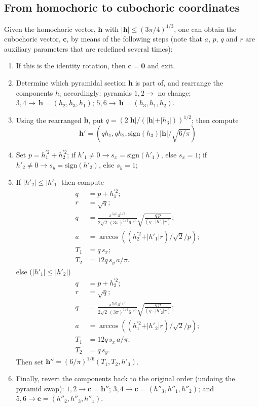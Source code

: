 \subsection{From homochoric to cubochoric coordinates}
Given the homochoric vector, $\mathbf{h}$ with $\vert\mathbf{h}\vert\le (3\pi/4)^{1/3}$, one can obtain the cubochoric vector, $\mathbf{c}$, by means of the following steps
(note that $a$, $p$, $q$ and $r$ are auxiliary parameters that are redefined several times):
\begin{enumerate}
	\item If this is the identity rotation, then $\mathbf{c}=\mathbf{0}$ and exit.
	\item Determine which pyramidal section $\mathbf{h}$ is part of, and rearrange the components $h_i$
	accordingly: pyramids $1,2\rightarrow$ no change; $3,4\rightarrow\,\mathbf{h}=(h_2,h_3,h_1)$; 
	$5,6\rightarrow\, \mathbf{h}=(h_3,h_1,h_2)$.
	\item Using the rearranged $\mathbf{h}$, put $q=(2\vert\mathbf{h}\vert/(\vert\mathbf{h}\vert+\vert h_3\vert))^{1/2}$;
	then compute 
	\[
		\mathbf{h}' = \left( q h_1, q h_2, \text{sign}(h_3)\vert\mathbf{h}\vert/\sqrt{6/\pi} \right)
	\]
	\item Set $p = h_1^{\prime 2}+h_2^{\prime 2}$; if $h'_1 \ne 0\rightarrow s_x=\text{sign}(h'_1)$, else $s_x=1$;
	if $h'_2\ne 0\rightarrow s_y=\text{sign}(h'_2)$, else $s_y=1$;
	\item If $\vert h'_2\vert \le \vert h'_1\vert$ then compute
	\begin{align*}
		q &= p + h_1^{\prime 2};\\
		r &= \sqrt{q};\\
		q &= \frac{\pi^{5/6}4^{1/3}}{2\sqrt{2}\,(3\pi)^{1/3}6^{1/6}}\sqrt{\frac{q\, p}{(q-\vert h'_1\vert r)}};\\
		a &= \arccos( (h^{\prime 2}_2+\vert h'_1\vert r)/\sqrt{2}/p);\\
		T_1 &= q\, s_x;\\
		T_2 &= 12 q\, s_y\, a/\pi.
	\end{align*}
	else ($\vert h'_1\vert \le \vert h'_2\vert$)
	\begin{align*}
		q &= p + h_2^{\prime 2};\\
		r &= \sqrt{q};\\
		q &= \frac{\pi^{5/6}4^{1/3}}{2\sqrt{2}\,(3\pi)^{1/3}6^{1/6}}\sqrt{\frac{q\, p}{(q-\vert h'_2\vert r)}};\\
		a &= \arccos( (h^{\prime 2}_1+\vert h'_2\vert r)/\sqrt{2}/p);\\
		T_1 &= 12 q\, s_x\, a/\pi;\\
		T_2 &= q\, s_y.
	\end{align*}
	Then set $\mathbf{h}''= (6/\pi)^{1/6}(T_1, T_2, h'_3)$.
	\item Finally, revert the components back to the original order (undoing the pyramid swap): 
	$1,2\rightarrow \mathbf{c}=\mathbf{h}''$; $3,4\rightarrow \mathbf{c}=(h''_3,h''_1,h''_2)$; and
	$5,6\rightarrow \mathbf{c}=(h''_2,h''_3,h''_1)$.
\end{enumerate} 

